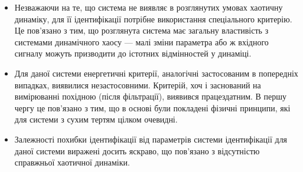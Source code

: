 \begin{itemize}

  \item
    Незважаючи на те, що система не виявляє в розглянутих умовах
    хаотичну динаміку, для її ідентифікації потрібне використання
    спеціального критерію. Це пов'язано з тим, що розглянута система
    має загальну властивість з системами динамічного хаосу --- малі
    зміни параметра або ж вхідного сигналу можуть призводити до
    істотних відмінностей у динаміці.

  \item
    Для даної системи енергетичні критерії, аналогічні застосованим
    в попередніх випадках, виявилися незастосовними. Критерій, хоч і
    заснований на вимірюванні похідною (після фільтрації), виявився
    працездатним. В першу чергу це пов'язано з тим, що в основі були
    покладені фізичні принципи, які для системи з сухим тертям цілком очевидні.

  \item
    Залежності похибки ідентифікації від параметрів системи
    ідентифікації для даної системи виражені досить яскраво, що
    пов'язано з відсутністю справжньої хаотичної динаміки.

\end{itemize}







